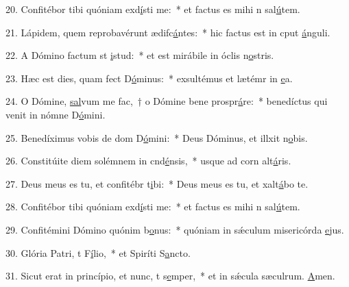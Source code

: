 20. Confitébor tibi quóniam exd\uline{í}sti me:~* et factus es mihi n sal\uline{ú}tem.\par 
21. Lápidem, quem reprobavérunt ædifc\uline{á}ntes:~* hic factus est in cput \uline{á}nguli.\par 
22. A Dómino factum st \uline{i}stud:~* et est mirábile in óclis n\uline{o}stris.\par 
23. Hæc est dies, quam fect D\uline{ó}minus:~* exsultémus et lætémr in \uline{e}a.\par 
24. O Dómine, \uline{sal}vum me fac,~† o Dómine bene prospr\uline{á}re:~* benedíctus qui venit in nómne D\uline{ó}mini.\par 
25. Benedíximus vobis de dom D\uline{ó}mini:~* Deus Dóminus, et illxit n\uline{o}bis.\par 
26. Constitúite diem solémnem in cnd\uline{é}nsis,~* usque ad corn alt\uline{á}ris.\par 
27. Deus meus es tu, et confitébr t\uline{i}bi:~* Deus meus es tu, et xalt\uline{á}bo te.\par 
28. Confitébor tibi quóniam exd\uline{í}sti me:~* et factus es mihi n sal\uline{ú}tem.\par 
29. Confitémini Dómino quónim b\uline{o}nus:~* quóniam in sǽculum misericórda \uline{e}jus.\par 
30. Glória Patri, t F\uline{í}lio,~* et Spiríti S\uline{a}ncto.\par 
31. Sicut erat in princípio, et nunc, t s\uline{e}mper,~* et in sǽcula sæculrum. \uline{A}men.\par 

